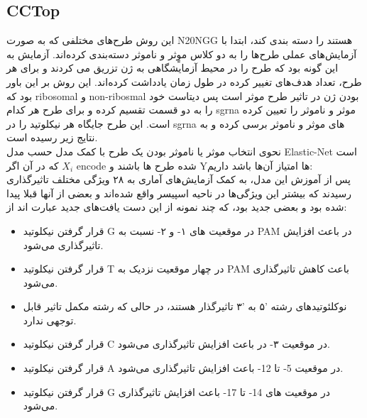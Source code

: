 \documentclass[12pt,a4paper,BCOR=.7cm,headsepline,bibliography=totoc]{report}
\begin{document}
\subsection{CCTop~\cite{CCTop}}
این روش طرح‌های مختلفی که به صورت N20NGG هستند را دسته بندی کند، ابتدا با آزمایش‌های عملی طرح‌ها را به دو کلاس موٍثر و ناموثر دسته‌بندی کرده‌اند. آزمایش به این گونه بود که طرح را  در محیط آزمایشگاهی به ژن تزریق می کردند و برای هر طرح، تعداد هدف‌های تغییر کرده در طول زمان یادداشت کرده‌اند. این روش بر این باور بود که ribosomal و non-ribosmal بودن ژن در تاثیر طرح موثر است پس دیتاست خود را به دو قسمت تقسیم کرده و برای طرح هر کدام sgrna موثر و ناموثر را تعیین کرده است. این طرح جایگاه هر نیکلوتید را در sgrna های موثر و ناموثر برسی کرده و به نتایج زیر رسیده است.\\
نحوی انتخاب موثر یا ناموثر بودن یک طرح با کمک مدل حسب مدل  Elastic-Net است که در آن اگر
 $X_i$
encode شده طرح ها باشند
و Yها امتیاز آن‌ها باشد داریم:
\\
پس از آموزش این مدل، به کمک آزمایش‌های آماری به ۲۸ ویژگی مختلف تاثیرگذاری رسیدند که بیشتر این ویژگی‌ها در ناحیه اسپیسر واقع شده‌اند و بعضی از آنها قبلا پیدا شده بود و بعضی جدید بود، که چند نمونه از این دست یافت‌های جدید عبارت اند از:
\begin{itemize}
\item
 قرار گرفتن نیکلوتید G در موقعیت های ۱- و ۲- نسبت به PAM در  باعث افزایش تاثیرگذاری می‌شود.
\item 
قرار گرفتن نیکلوتید T در چهار موقعیت نزدیک به PAM باعث کاهش تاثیرگذاری می‌شود.
\item
  نوکلئوتیدهای رشته '۵ به '۳ تاثیرگذار هستند، در حالی که رشته مکمل تاثیر قابل توجهی ندارد.
\item
قرار گرفتن نیکلوتید C در موقعیت ۳- در  باعث افزایش تاثیرگذاری می‌شود.
\item
 
قرار گرفتن نیکلوتید A در موقعیت 5- تا 12- باعث افزایش تاثیرگذاری می‌شود.
\item 
قرار گرفتن نیکلوتید G در موقعیت های 14- تا 17- باعث افزایش تاثیرگذاری می‌شود.
\end{itemize}
\end{document}
